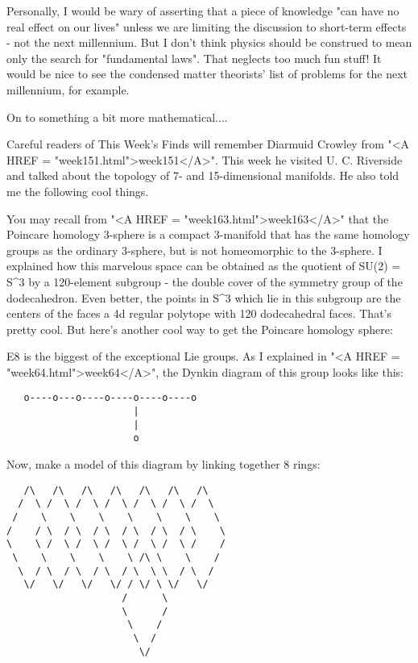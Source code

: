 Personally, I would be wary of asserting that a piece of knowledge
"can have no real effect on our lives" unless we are limiting
the discussion to short-term effects - not the next millennium.  But I
don't think physics should be construed to mean only the search for
"fundamental laws".  That neglects too much fun stuff!  It
would be nice to see the condensed matter theorists' list of problems
for the next millennium, for example.

On to something a bit more mathematical....

Careful readers of This Week's Finds will remember Diarmuid Crowley from
"<A HREF = "week151.html">week151</A>".  This week he visited
U. C. Riverside and talked about the topology of 7- and 15-dimensional
manifolds.  He also told me the following cool things.

You may recall from "<A HREF = "week163.html">week163</A>"
that the Poincare homology 3-sphere is a compact 3-manifold that has the
same homology groups as the ordinary 3-sphere, but is not homeomorphic
to the 3-sphere.  I explained how this marvelous space can be obtained
as the quotient of SU(2) = S^{3} by a 120-element subgroup - the double
cover of the symmetry group of the dodecahedron.  Even better, the
points in S^{3} which lie in this subgroup are the centers of the faces a
4d regular polytope with 120 dodecahedral faces.  That's pretty cool.
But here's another cool way to get the Poincare homology sphere:

E8 is the biggest of the exceptional Lie groups.  As I explained in
"<A HREF = "week64.html">week64</A>", the Dynkin diagram of
this group looks like this:


\begin{verbatim}
   o----o---o----o----o----o----o
                      |
                      |
                      o
\end{verbatim}
    
Now, make a model of this diagram by linking together 8 rings:

\begin{verbatim}
   /\   /\   /\   /\   /\   /\   /\ 
  /  \ /  \ /  \ /  \ /  \ /  \ /  \
 /    \    \    \    \    \    \    \
/    / \  / \  / \  / \  / \  / \    \ 
\    \ /  \ /  \ /  \ /  \ /  \ /    / 
 \    \    \    \    \ /\ \    \    /
  \  / \  / \  / \  / \  \ \  / \  /
   \/   \/   \/   \/ / \/ \ \/   \/
                    /      \ 
                    \      /
                     \    /
                      \  /
                       \/ 
\end{verbatim}
    
